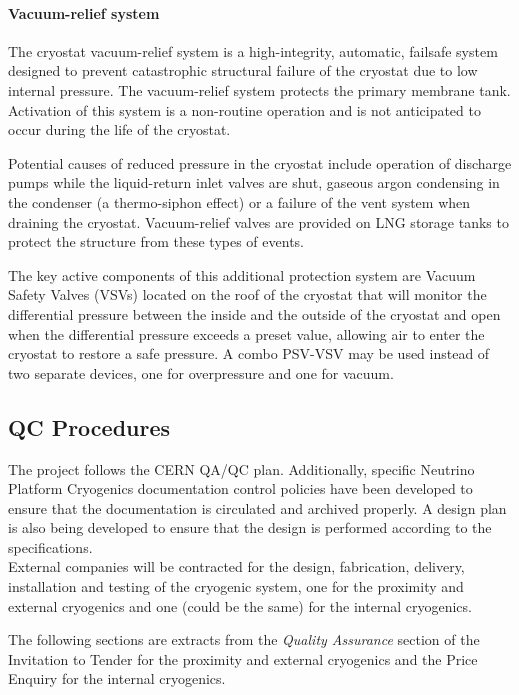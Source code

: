 \paragraph{Vacuum-relief system}

The cryostat vacuum-relief system is a high-integrity, automatic, failsafe system designed to prevent catastrophic structural failure of the cryostat due to low internal pressure. The vacuum-relief system protects the primary membrane tank. Activation of this system is a non-routine operation and is not anticipated to occur during the life of the cryostat.

Potential causes of reduced pressure in the cryostat include operation of discharge pumps while the liquid-return inlet valves are shut, gaseous argon condensing in the condenser (a thermo-siphon effect) or a failure of the vent system when draining the cryostat. Vacuum-relief valves are provided on LNG storage tanks to protect the structure from these types of events.

The key active components of this additional protection system are Vacuum Safety Valves (VSVs) located on the roof of the cryostat that will monitor the differential pressure between the inside and the outside of the cryostat and open when the differential pressure exceeds a preset value, allowing air to enter the cryostat to restore a safe pressure. A combo PSV-VSV may be used instead of two separate devices, one for overpressure and one for vacuum.

\subsection{QC Procedures}

The project follows the CERN QA/QC plan. Additionally, specific Neutrino Platform Cryogenics documentation control policies have been developed to ensure that the documentation is circulated and archived properly. A design plan is also being developed to ensure that the design is performed according to the specifications.\\
%
External companies will be contracted for the design, fabrication, delivery, installation and testing of the cryogenic system, one for the proximity and external cryogenics and one (could be the same) for the internal cryogenics.

The following sections are extracts from the \textit{Quality Assurance} section of the Invitation to Tender for the proximity and external cryogenics and the Price Enquiry for the internal cryogenics. 

